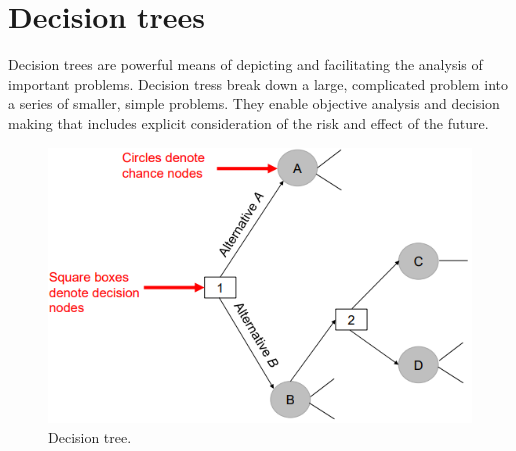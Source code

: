 \section{Decision trees}
Decision trees are powerful means of depicting and facilitating the analysis of important problems. Decision tress break down a large, complicated problem into a series of smaller, simple problems. They enable objective analysis and decision making that includes explicit consideration of the risk and effect of the future.
\begin{figure}[H]
    \centering
    \includegraphics[width = 0.7 \textwidth]{img/figure63.png}
    \caption{Decision tree.}
\end{figure}
